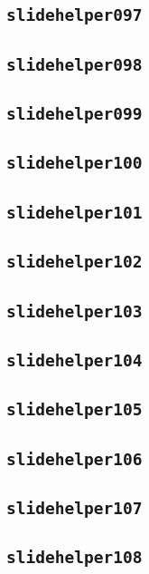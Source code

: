 \subsection{\texttt{slidehelper097}}
\newpage
\subsection{\texttt{slidehelper098}}
\newpage
\subsection{\texttt{slidehelper099}}
\newpage
\subsection{\texttt{slidehelper100}}
\newpage
\subsection{\texttt{slidehelper101}}
\newpage
\subsection{\texttt{slidehelper102}}
\newpage
\subsection{\texttt{slidehelper103}}
\newpage
\subsection{\texttt{slidehelper104}}
\newpage
\subsection{\texttt{slidehelper105}}
\newpage
\subsection{\texttt{slidehelper106}}
\newpage
\subsection{\texttt{slidehelper107}}
\newpage
\subsection{\texttt{slidehelper108}}
\newpage
